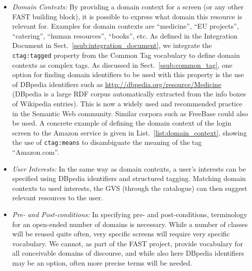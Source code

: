 \documentclass{article}
\begin{document}
\begin{itemize}
	\item \emph{Domain Contexts:} By providing a domain context for a screen (or any other FAST building block), it is possible to express what domain this resource is relevant for. Examples for domain contexts are ``medicine'', ``EU projects'', ``catering'', ``human resources'', ``books'', etc. As defined in the Integration Document in Sect.~\ref{ssub:integration_document}, we integrate the \texttt{ctag:tagged} property from the Common Tag vocabulary to define domain contexts as complex tags. As discussed in Sect.~\ref{ssub:common_tag}, one option for finding domain identifiers to be used with this property is the use of DBpedia identifiers such as \url{http://dbpedia.org/resource/Medicine} (DBpedia is a large RDF corpus automatically extracted from the info boxes of Wikipedia entries). This is now a widely used and recommended practice in the Semantic Web community. Similar corpora such as FreeBase could also be used. A concrete example of defining the domain context of the login screen to the Amazon service is given in List.~\ref{list:domain_context}, showing the use of \texttt{ctag:means} to disambiguate the meaning of the tag ``Amazon.com''.
	\item \emph{User Interests:} In the same way as domain contexts, a user's interests can be specified using DBpedia identifiers and structured tagging. Matching domain contexts to used interests, the GVS (through the catalogue) can then suggest relevant resources to the user.
	\item \emph{Pre- and Post-conditions:} In specifying pre- and post-conditions, terminology for an open-ended number of domains is necessary. While a number of classes will be reused quite often, very specific screens will require very specific vocabulary. We cannot, as part of the FAST project, provide vocabulary for all conceivable domains of discourse, and while also here DBpedia identifiers may be an option, often more precise terms will be needed.
\end{itemize}

\singlespacing
{}
\begin{figure}
	
\end{figure}
\doublespacing
\end{document}
